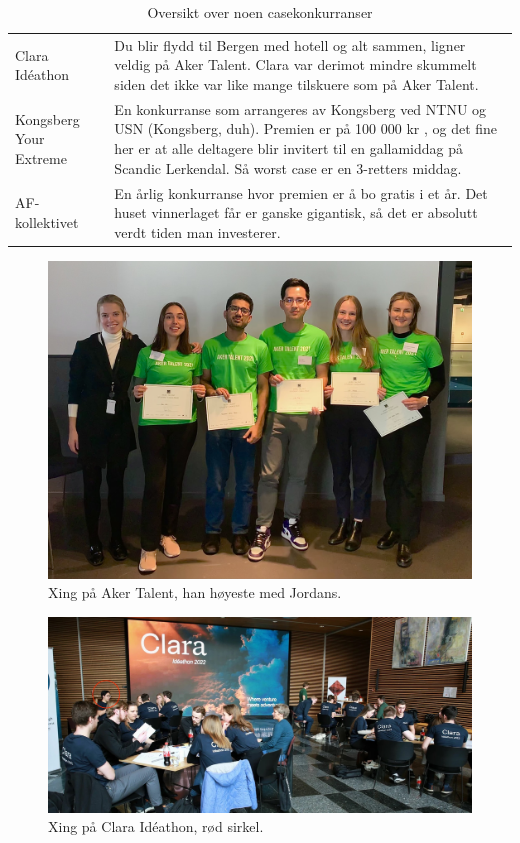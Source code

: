 \begin{table}[H]
\begin{tabular}{p{3cm}p{10cm}}
        Clara Idéathon & Du blir flydd til Bergen med hotell og alt sammen, ligner veldig på Aker Talent. Clara var derimot mindre skummelt siden det ikke var like mange tilskuere som på Aker Talent. \\
        
        Kongsberg Your Extreme & En konkurranse som arrangeres av Kongsberg ved NTNU og USN (Kongsberg, duh). Premien er på 100 000 kr , og det fine her er at alle deltagere blir invitert til en gallamiddag på Scandic Lerkendal. Så worst case er en 3-retters middag. \\
        
        AF-kollektivet & En årlig konkurranse hvor premien er å bo gratis i et år. Det huset vinnerlaget får er ganske gigantisk, så det er absolutt verdt tiden man investerer. \\
        \bottomrule
    \end{tabular}
    \caption{Oversikt over noen casekonkurranser}
    \label{tab:Casekonkurranser}
\end{table}

\begin{figure}[H]
    \centering
    \includegraphics[width=0.6\linewidth]{images/Aker.jpg}
    \caption{Xing på Aker Talent, han høyeste med Jordans.}
    \label{fig:Aker}
\end{figure}

\begin{figure}[H]
    \centering
    \includegraphics[width=0.8\linewidth]{images/Clara.jpg}
    \caption{Xing på Clara Idéathon, rød sirkel.}
    \label{fig:Clara}
\end{figure}

